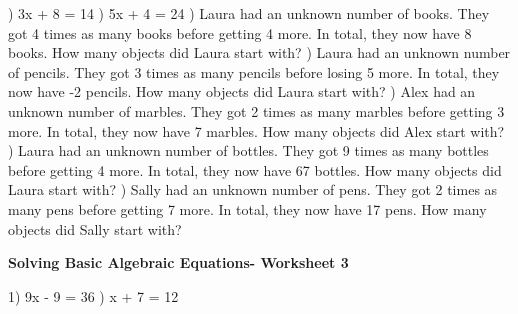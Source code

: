 \documentclass{article}%
\begin{document}
) 3x + 8 = 14%
\newline%
\newline%
) 5x + 4 = 24%
\newline%
\newline%
) Laura had an unknown number of books. They got 4 times as many books before getting 4 more. In total, they now have 8 books. How many objects did Laura start with?%
\newline%
\newline%
) Laura had an unknown number of pencils. They got 3 times as many pencils before losing 5 more. In total, they now have -2 pencils. How many objects did Laura start with?%
\newline%
\newline%
) Alex had an unknown number of marbles. They got 2 times as many marbles before getting 3 more. In total, they now have 7 marbles. How many objects did Alex start with?%
\newline%
\newline%
) Laura had an unknown number of bottles. They got 9 times as many bottles before getting 4 more. In total, they now have 67 bottles. How many objects did Laura start with?%
\newline%
\newline%
) Sally had an unknown number of pens. They got 2 times as many pens before getting 7 more. In total, they now have 17 pens. How many objects did Sally start with?%
\newline%
\newline%
\newline%
\pagebreak%
\large%
\begin{center}%
\textbf{Solving Basic Algebraic Equations- Worksheet 3}%
\newline%
\newline%
\newline%
\end{center} \normalsize%
1) 9x - 9 = 36%
\newline%
\newline%
) x + 7 = 12%
\newline%
\newline%
\end{document}
